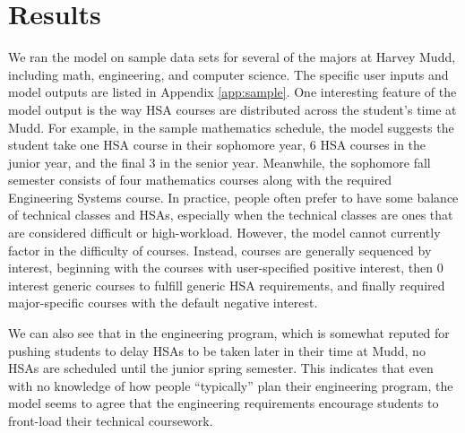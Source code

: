 \documentclass[12pt]{article}
\begin{document}
\section{Results}\label{sec:results}

We ran the model on sample data sets for several of the majors at Harvey Mudd, including math, engineering, and computer science. The specific user inputs and model outputs are listed in Appendix \ref{app:sample}. One interesting feature of the model output is the way HSA courses are distributed across the student's time at Mudd. For example, in the sample mathematics schedule, the model suggests the student take one HSA course in their sophomore year, 6 HSA courses in the junior year, and the final 3 in the senior year. Meanwhile, the sophomore fall semester consists of four mathematics courses along with the required Engineering Systems course. In practice, people often prefer to have some balance of technical classes and HSAs, especially when the technical classes are ones that are considered difficult or high-workload. However, the model cannot currently factor in the difficulty of courses. Instead, courses are generally sequenced by interest, beginning with the courses with user-specified positive interest, then 0 interest generic courses to fulfill generic HSA requirements, and finally required major-specific courses with the default negative interest.

We can also see that in the engineering program, which is somewhat reputed for pushing students to delay HSAs to be taken later in their time at Mudd, no HSAs are scheduled until the junior spring semester. This indicates that even with no knowledge of how people ``typically'' plan their engineering program, the model seems to agree that the engineering requirements encourage students to front-load their technical coursework.
\end{document}
